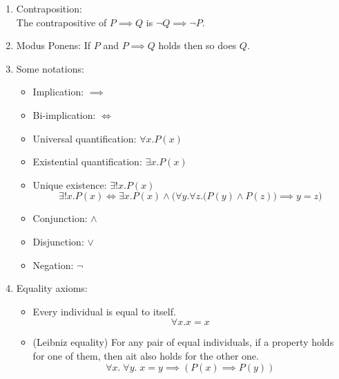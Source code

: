 \documentclass{article}
\begin{document}
\begin{enumerate}
\begin{itemize}[topsep=0pt]
        \end{itemize}
    \item Contraposition:\\
        The contrapositive of $P\implies Q$ is $\neg Q\implies\neg P$.
    \item Modus Ponens:
        If $P$ and $P\implies Q$ holds then so does $Q$.
        \begin{prooftree}
        \end{prooftree}
    \item Some notations:
        \begin{itemize}[topsep=0pt]
            \item Implication: $\implies$
            \item Bi-implication: $\Longleftrightarrow$
            \item Universal quantification: $\forall x.P(x)$
            \item Existential quantification: $\exists x.P(x)$
            \item Unique existence: $\exists!x.P(x)$
                $$\exists!x.P(x)\Longleftrightarrow\exists x.P(x)\wedge\Big(\forall y.\forall z.\big(P(y)\wedge P(z)\big)\implies y=z\Big)$$
            \item Conjunction: $\wedge$
            \item Disjunction: $\vee$
            \item Negation: $\neg$
        \end{itemize}
    \item Equality axioms:
        \begin{itemize}[topsep=0pt]
            \item Every individual is equal to itself.
                $$\forall x.x=x$$
            \item (Leibniz equality) For any pair of equal individuals, if a property holds for one of them, then ait also holds for the other one.
                $$\forall x.\;\forall y.\;x=y\implies (P(x)\implies P(y))$$
        \end{itemize}
\end{enumerate}
\end{document}
